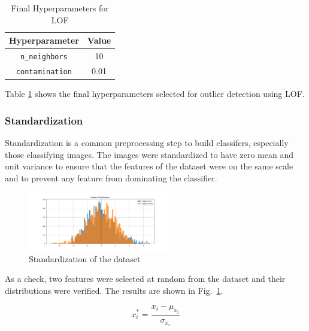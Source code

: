 \documentclass[conference]{IEEEtran}
\begin{document}
    \begin{table}[htbp]
        \caption{Final Hyperparameters for LOF}
        \begin{center}
            \begin{tabular}{|c|c|}
                \hline
                \textbf{Hyperparameter} & \textbf{Value} \\
                \hline
                \texttt{n\_neighbors} & 10 \\
                \hline
                \texttt{contamination} & 0.01 \\
                \hline
            \end{tabular}
            \label{tab:lof}
        \end{center}
    \end{table}

    Table \ref{tab:lof} shows the final hyperparameters selected for outlier detection using LOF.

    \subsubsection{Standardization}
    \label{sec:standardization}
    Standardization is a common preprocessing step to build classifers, especially those classifying images.
    The images were standardized to have zero mean and unit variance to ensure that the features of the
    dataset were on the same scale and to prevent any feature from dominating the classifier.

    \begin{figure}[htbp]
        \centerline{\includegraphics[width=0.55\textwidth]{Assets/standardized.png}}
        \caption{Standardization of the dataset}
        \label{fig:standardization}
    \end{figure}

    As a check, two features were selected at random from the dataset and their distributions were verified.
    The results are shown in Fig.~\ref{fig:standardization}.

    \begin{equation}
        \label{eq:standardization}
        x_{i}^{*} = \frac{x_{i} - \mu_{x_{i}}}{\sigma_{x_{i}}}
    \end{equation}
\end{document}
